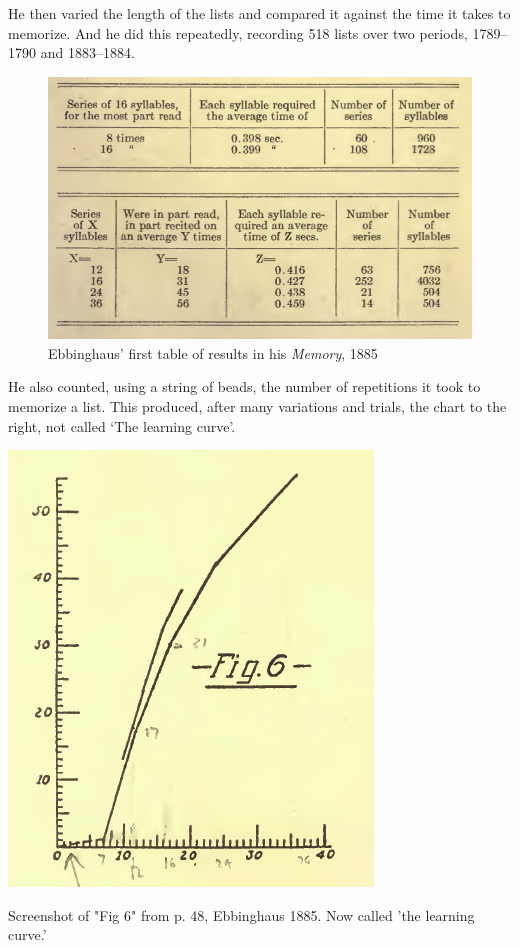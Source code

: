 \begin{refsection}
He then varied the length of the lists and compared it against the time it takes to memorize. And he did this repeatedly, recording 518 lists over two periods, 1789--1790 and 1883--1884.
\begin{figure}\includegraphics{../images/ebbinghaus1885.png}\caption{Ebbinghaus' first table of results in his \emph{Memory}, 1885}\label{fig:ebbinghaus1}\end{figure}

He also counted, using a string of beads, the number of repetitions it took to memorize a list. This produced, after many variations and trials, the chart to the right, not called `The learning curve'.
\begin{marginfigure}
 \begin{center}

     \includegraphics[scale=0.5]{../images/ebbinghausFig6.png}
\end{center}
 \caption{Screenshot of "Fig 6" from p. 48, Ebbinghaus 1885. Now called 'the learning curve.'}
\label{fig: ebbinghaus6}
\end{marginfigure}



\end{refsection}
